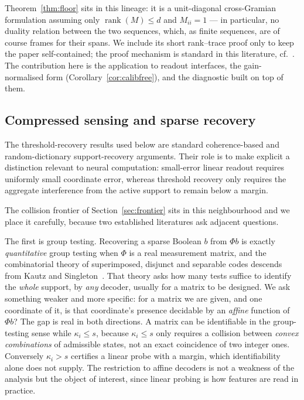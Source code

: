 Theorem~\ref{thm:floor} sits in this lineage: it is a unit-diagonal cross-Gramian formulation
assuming only $\operatorname{rank}(M)\le d$ and $M_{ii}=1$ --- in particular, no duality
relation between the two sequences, which, as finite sequences, are of course frames for their
spans. We include its short rank--trace proof only to keep the paper self-contained; the proof
mechanism is standard in this literature, cf.~\cite{datta2012geometry}. The contribution here
is the application to readout interfaces, the gain-normalised form
(Corollary~\ref{cor:calibfree}), and the diagnostic built on top of them.

\subsection{Compressed sensing and sparse recovery}

The threshold-recovery results used below are standard coherence-based and random-dictionary
support-recovery arguments. Their role is to make explicit a distinction relevant to neural
computation: small-error linear readout requires uniformly small coordinate error, whereas
threshold recovery only requires the aggregate interference from the active support to remain
below a margin.

The collision frontier of Section~\ref{sec:frontier} sits in this neighbourhood and we place it
carefully, because two established literatures ask adjacent questions.

The first is group testing. Recovering a sparse Boolean $b$ from $\Phi b$ is exactly
\emph{quantitative} group testing when $\Phi$ is a real measurement matrix, and the combinatorial
theory of superimposed, disjunct and separable codes descends from Kautz and
Singleton~\cite{kautz1964superimposed}. That theory asks how many tests suffice to identify the
\emph{whole} support, by \emph{any} decoder, usually for a matrix to be designed. We ask something
weaker and more specific: for a matrix we are given, and one coordinate of it, is that coordinate's
presence decidable by an \emph{affine} function of $\Phi b$? The gap is real in both directions.
A matrix can be identifiable in the group-testing sense while $\kappa_i\le s$, because
$\kappa_i\le s$ only requires a collision between \emph{convex combinations} of admissible states,
not an exact coincidence of two integer ones. Conversely $\kappa_i>s$ certifies a linear probe
with a margin, which identifiability alone does not supply. The restriction to affine decoders is
not a weakness of the analysis but the object of interest, since linear probing is how features
are read in practice.

